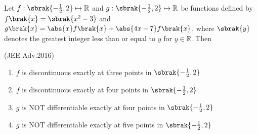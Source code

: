     \item 
	    Let $f:\sbrak{-\frac{1}{2}, 2}\mapsto \mathbb{R}$ and $g:\sbrak{-\frac{1}{2}, 2}\mapsto \mathbb{R}$ be functions defined by $f\brak{x}=\sbrak{x^2-3}$ and $g\brak{x}=\abs{x}f\brak{x}+\abs{4x-7}f\brak{x}$, where $\sbrak{y}$ denotes the greatest integer less than or equal to $y$ for $y\in \mathbb{R}$. Then 

    \hfill(JEE Adv.2016)
    
    \begin{enumerate}        
        \item $f$ is discontinuous exactly at three points in $\sbrak{-\frac{1}{2}, 2}$
        \item $f$ is discontinuous exactly at four points in $\sbrak{-\frac{1}{2}, 2}$
        \item $g$ is NOT differentiable exactly at four points in $\sbrak{-\frac{1}{2}, 2}$
        \item $g$ is NOT differentiable exactly at five points in $\sbrak{-\frac{1}{2}, 2}$
    \end{enumerate}


